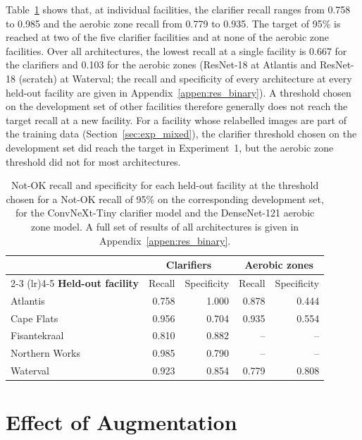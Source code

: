 Table~\ref{tab:res_binary_facility} shows that, at individual facilities, the clarifier recall ranges from 0.758 to 0.985 and the aerobic zone recall from 0.779 to 0.935. The target of 95\% is reached at two of the five clarifier facilities and at none of the aerobic zone facilities. Over all architectures, the lowest recall at a single facility is 0.667 for the clarifiers and 0.103 for the aerobic zones (ResNet-18 at Atlantis and ResNet-18 (scratch) at Waterval; the recall and specificity of every architecture at every held-out facility are given in Appendix~\ref{appen:res_binary}). A threshold chosen on the development set of other facilities therefore generally does not reach the target recall at a new facility. For a facility whose relabelled images are part of the training data (Section~\ref{sec:exp_mixed}), the clarifier threshold chosen on the development set did reach the target in Experiment~1, but the aerobic zone threshold did not for most architectures.

\begin{table}[htbp]
\centering
\caption{Not-OK recall and specificity for each held-out facility at the threshold chosen for a Not-OK recall of 95\% on the corresponding development set, for the ConvNeXt-Tiny clarifier model and the DenseNet-121 aerobic zone model. A full set of results of all architectures is given in Appendix~\ref{appen:res_binary}.}
\label{tab:res_binary_facility}
\begin{tabular}{l rr rr}
\toprule
& \multicolumn{2}{c}{\textbf{Clarifiers}} & \multicolumn{2}{c}{\textbf{Aerobic zones}} \\
\cmidrule(lr){2-3} \cmidrule(lr){4-5}
\textbf{Held-out facility} & Recall & Specificity & Recall & Specificity \\
\midrule
Atlantis & 0.758 & 1.000 & 0.878 & 0.444 \\
Cape Flats & 0.956 & 0.704 & 0.935 & 0.554 \\
Fisantekraal & 0.810 & 0.882 & -- & -- \\
Northern Works & 0.985 & 0.790 & -- & -- \\
Waterval & 0.923 & 0.854 & 0.779 & 0.808 \\
\bottomrule
\end{tabular}
\end{table}

\FloatBarrier


\section{Effect of Augmentation}
\label{sec:results_augmentation}

